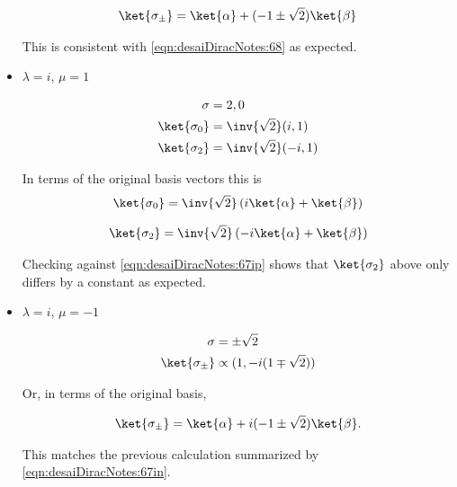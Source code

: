 \begin{itemize}
\begin{align}\label{eqn:desaiDiracNotes:73i}
\ket{\sigma_{\pm}} = \ket{\alpha} + (-1 \pm \sqrt{2}) \ket{\beta}
\end{align}

This is consistent with \ref{eqn:desaiDiracNotes:68} as expected.

\item $\lambda = i$, $\mu = 1$

\begin{align}\label{eqn:desaiDiracNotes:74}
\sigma &= 2,0 \\
\ket{\sigma_0} &= \inv{\sqrt{2}} (i,1) \\
\ket{\sigma_2} &= \inv{\sqrt{2}} (-i,1) 
\end{align}

In terms of the original basis vectors this is 
\begin{align}\label{eqn:desaiDiracNotes:74i}
\ket{\sigma_0} = \inv{\sqrt{2}}\left( i\ket{\alpha} + \ket{\beta} \right)
\end{align}

\begin{align}\label{eqn:desaiDiracNotes:74ii}
\ket{\sigma_2} = \inv{\sqrt{2}}\left( -i\ket{\alpha} + \ket{\beta} \right)
\end{align}

Checking against \ref{eqn:desaiDiracNotes:67ip} shows that $\ket{\sigma_2}$ above only differs by a constant as expected.

\item $\lambda = i$, $\mu = -1$

\begin{align}\label{eqn:desaiDiracNotes:75}
\sigma &= \pm \sqrt{2} \\
\ket{\sigma_{\pm}} &\propto (1, -i(1 \mp \sqrt{2}))
\end{align}

Or, in terms of the original basis,

\begin{align}\label{eqn:desaiDiracNotes:75i}
\ket{\sigma_{\pm}} = \ket{\alpha} + i (-1 \pm \sqrt{2}) \ket{\beta}.
\end{align}

This matches the previous calculation summarized by \ref{eqn:desaiDiracNotes:67in}.

\end{itemize}
